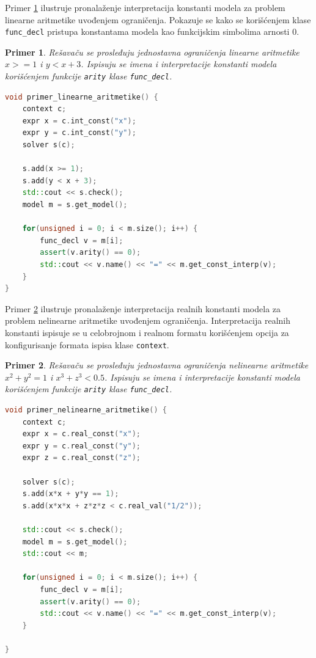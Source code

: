 \documentclass[12pt,oneside]{memoir}
\newtheorem{primer}{Primer}
\begin{document}
Primer \ref{ex4} ilustruje pronalaženje interpretacija konstanti modela za problem linearne aritmetike uvođenjem ograničenja.
Pokazuje se kako se korišćenjem klase \texttt{func\_decl} pristupa konstantama modela kao funkcijskim simbolima arnosti 0.
\begin{primer} \label{ex4}
Rešavaču se prosleđuju jednostavna ograničenja linearne aritmetike $x >= 1$  i $y < x + 3$. Ispisuju se imena i interpretacije konstanti modela korišćenjem
funkcije \texttt{arity} klase \texttt{func\_decl}.
\\
\begin{lstlisting}[language=C++]
void primer_linearne_aritmetike() {
    context c;
    expr x = c.int_const("x");
    expr y = c.int_const("y");
    solver s(c);
    
    s.add(x >= 1);
    s.add(y < x + 3);
    std::cout << s.check();
    model m = s.get_model();

    for(unsigned i = 0; i < m.size(); i++) {
        func_decl v = m[i];
        assert(v.arity() == 0); 
        std::cout << v.name() << "=" << m.get_const_interp(v);
    }
}
\end{lstlisting}
\end{primer}

Primer \ref{ex5} ilustruje pronalaženje interpretacija realnih konstanti modela za problem nelinearne aritmetike uvođenjem ograničenja. Interpretacija realnih konstanti ispisuje se u celobrojnom i realnom formatu korišćenjem opcija za konfigurisanje formata ispisa klase \texttt{context}. 

\begin{primer} \label{ex5}
Rešavaču se prosleđuju jednostavna ograničenja nelinearne aritmetike 
$x^2 + y^2 = 1$ i $x^3 + z^3 < 0.5$. Ispisuju se imena i interpretacije konstanti modela korišćenjem funkcije \texttt{arity} klase \texttt{func\_decl}.
\\
\begin{lstlisting}[language=C++]
void primer_nelinearne_aritmetike() {    
    context c;
    expr x = c.real_const("x");
    expr y = c.real_const("y");
    expr z = c.real_const("z");
                     
    solver s(c);
    s.add(x*x + y*y == 1);                    
    s.add(x*x*x + z*z*z < c.real_val("1/2"));  
    
    std::cout << s.check();
    model m = s.get_model();
    std::cout << m;
    
    for(unsigned i = 0; i < m.size(); i++) {
        func_decl v = m[i];
        assert(v.arity() == 0); 
        std::cout << v.name() << "=" << m.get_const_interp(v);
    }

}
\end{lstlisting}
\end{primer}
\end{document}
